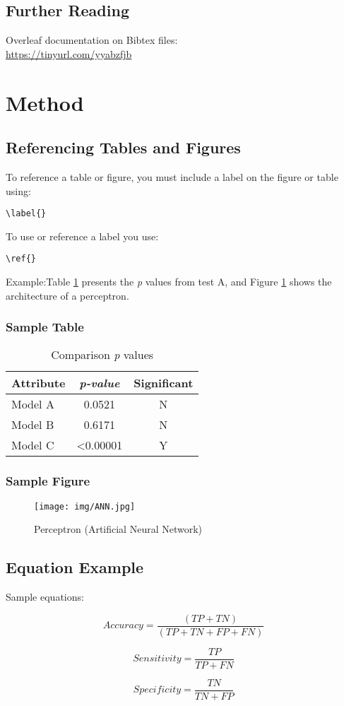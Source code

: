 \subsection{Further Reading}
Overleaf documentation on Bibtex files: \\
\url{https://tinyurl.com/yyabzfjb}

\pagebreak




\section{Method}
\subsection{Referencing Tables and Figures}
To reference a table or figure, you must include a label on the figure or table using: 
\begin{verbatim}
\label{}  
\end{verbatim}
To use or reference a label you use:
\begin{verbatim}
\ref{}
\end{verbatim}
Example:Table \ref{tab:pvalues} presents the \textit{p} values from test A, and Figure \ref{lab:perceptron} shows the architecture of a perceptron.




\subsubsection{Sample Table}
\begin{table}[ht!]
\centering
    
	\caption{Comparison \textit{p} values}
	\begin{tabular}{ |l|c|c|}	
		\hline		
		\textbf{Attribute} & \textbf{\textit{p-value}} & \textbf{Significant} \\ \hline
		Model A	 & 0.0521 & N \\ \hline
		Model B  & 0.6171 & N \\ \hline 
		Model C  & <0.00001 & Y \\ \hline 
	\end{tabular}
	\label{tab:pvalues}
\end{table} 


\subsubsection{Sample Figure}
\begin{figure}[ht!]
 	\centering
 	\caption{Perceptron (Artificial Neural Network)}
 	\texttt{[image: img/ANN.jpg]}
 	\label{lab:perceptron}
 \end{figure}
 

\subsection{Equation Example}
Sample equations:

\begin{equation}
Accuracy = \frac{(TP + TN)}{(TP + TN + FP + FN)}
\end{equation}


\begin{equation}
Sensitivity = \frac{TP}{TP + FN}
\end{equation}

\begin{equation}
Specificity = \frac{TN}{TN + FP}
\end{equation}

\pagebreak